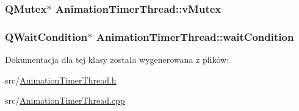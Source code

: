 \hypertarget{class_animation_timer_thread_a0e631857e4de3236956f34fea244958f}{
\subsubsection[{v\-Mutex}]{\setlength{\rightskip}{0pt plus 5cm}Q\-Mutex$\ast$ Animation\-Timer\-Thread\-::v\-Mutex\hspace{0.3cm}{\ttfamily [private]}}}\label{class_animation_timer_thread_a0e631857e4de3236956f34fea244958f}
\hypertarget{class_animation_timer_thread_ad0afad858a6fb161d4e2c9a9912e958a}{
\subsubsection[{wait\-Condition}]{\setlength{\rightskip}{0pt plus 5cm}Q\-Wait\-Condition$\ast$ Animation\-Timer\-Thread\-::wait\-Condition\hspace{0.3cm}{\ttfamily [private]}}}\label{class_animation_timer_thread_ad0afad858a6fb161d4e2c9a9912e958a}


Dokumentacja dla tej klasy została wygenerowana z plików\-:\begin{DoxyCompactItemize}
\item 
src/\hyperlink{_animation_timer_thread_8h}{Animation\-Timer\-Thread.\-h}\item 
src/\hyperlink{_animation_timer_thread_8cpp}{Animation\-Timer\-Thread.\-cpp}\end{DoxyCompactItemize}
